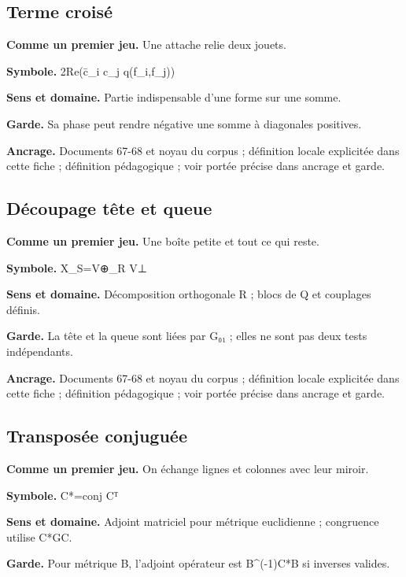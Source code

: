 \documentclass[
  9pt,
  a4paper,
]{article}
\begin{document}
\hypertarget{terme-croisuxe9}{%
\subsection{Terme croisé}\label{terme-croisuxe9}}

\textbf{Comme un premier jeu.} Une attache relie deux jouets.

\textbf{Symbole.} 2Re(c̄\_i c\_j q(f\_i,f\_j))

\textbf{Sens et domaine.} Partie indispensable d'une forme sur une
somme.

\textbf{Garde.} Sa phase peut rendre négative une somme à diagonales
positives.

\textbf{Ancrage.} Documents 67-68 et noyau du corpus ; définition locale
explicitée dans cette fiche ; définition pédagogique ; voir portée
précise dans ancrage et garde.

\hypertarget{duxe9coupage-tuxeate-et-queue}{%
\subsection{Découpage tête et
queue}\label{duxe9coupage-tuxeate-et-queue}}

\textbf{Comme un premier jeu.} Une boîte petite et tout ce qui reste.

\textbf{Symbole.} X\_S=V⊕\_R V⊥

\textbf{Sens et domaine.} Décomposition orthogonale R ; blocs de Q et
couplages définis.

\textbf{Garde.} La tête et la queue sont liées par G₀₁ ; elles ne sont
pas deux tests indépendants.

\textbf{Ancrage.} Documents 67-68 et noyau du corpus ; définition locale
explicitée dans cette fiche ; définition pédagogique ; voir portée
précise dans ancrage et garde.

\hypertarget{transposuxe9e-conjuguuxe9e}{%
\subsection{Transposée conjuguée}\label{transposuxe9e-conjuguuxe9e}}

\textbf{Comme un premier jeu.} On échange lignes et colonnes avec leur
miroir.

\textbf{Symbole.} C*=conj Cᵀ

\textbf{Sens et domaine.} Adjoint matriciel pour métrique euclidienne ;
congruence utilise C*GC.

\textbf{Garde.} Pour métrique B, l'adjoint opérateur est B\^{}(-1)C*B si
inverses valides.
\end{document}
